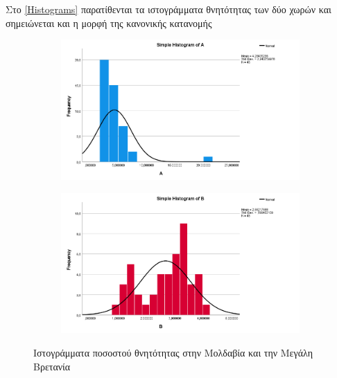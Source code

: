 \documentclass{article}
\begin{document}
    Στο \autoref{Histograms} παρατίθενται τα ιστογράμματα θνητότητας των δύο χωρών και σημειώνεται και η μορφή της κανονικής κατανομής
    
    \begin{figure}[H]
    
        \centering	
    	\begin{adjustbox}{center}
            \begin{subfigure}[c]{.8\textwidth}
    			\includegraphics[width=1\textwidth,height=\textheight,keepaspectratio]{media/2/histA.png}
    		\end{subfigure}
    
    		\begin{subfigure}[c]{.8\textwidth}    
    			\includegraphics[width=1\textwidth,height=\textheight,keepaspectratio]{media/2/histB.png}
    		\end{subfigure}%
    	\end{adjustbox}
    	\caption{Ιστογράμματα ποσοστού θνητότητας στην Μολδαβία και την Μεγάλη Βρετανία}
    	\label{Histograms}
    \end{figure}
    
\end{document}
